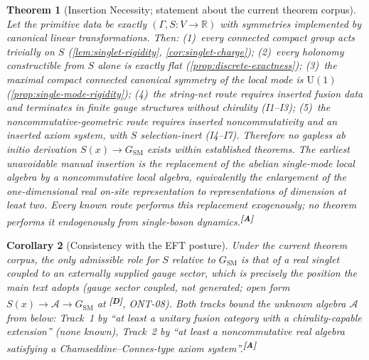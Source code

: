 \documentclass[12pt,a4paper,twoside]{article}
\theoremstyle{plain}
\newtheorem{theorem}{Theorem}[section]
\newtheorem{corollary}[theorem]{Corollary}
\theoremstyle{definition}
\theoremstyle{remark}
\newcommand{\catmark}[1]{\textsuperscript{\textsf{\textbf{[#1]}}}}
\begin{document}
\begin{theorem}[Insertion Necessity; statement about the current theorem corpus]
\label{thm:insertion-necessity}
Let the primitive data be exactly $(\Gamma,S:V\to\mathbb{R})$ with
symmetries implemented by canonical linear transformations. Then:
(1)~every connected compact group acts trivially on $S$
(\cref{lem:singlet-rigidity}, \cref{cor:singlet-charge});
(2)~every holonomy constructible from $S$ alone is exactly flat
(\cref{prop:discrete-exactness});
(3)~the maximal compact connected canonical symmetry of the local mode is
$\mathrm{U}(1)$ (\cref{prop:single-mode-rigidity});
(4)~the string-net route requires inserted fusion data and terminates in
finite gauge structures without chirality (I1--I3);
(5)~the noncommutative-geometric route requires inserted noncommutativity
and an inserted axiom system, with $S$ selection-inert (I4--I7).
Therefore no gapless ab initio derivation $S(x)\to G_{\mathrm{SM}}$ exists
within established theorems. The earliest unavoidable manual insertion is
the replacement of the abelian single-mode local algebra by a noncommutative
local algebra, equivalently the enlargement of the one-dimensional real
on-site representation to representations of dimension at least two. Every
known route performs this replacement exogenously; no theorem performs it
endogenously from single-boson dynamics.\catmark{A}
\end{theorem}

\begin{corollary}[Consistency with the EFT posture]
\label{cor:eft-posture}
Under the current theorem corpus, the only admissible role for $S$ relative
to $G_{\mathrm{SM}}$ is that of a real singlet coupled to an externally
supplied gauge sector, which is precisely the position the main text adopts
(gauge sector coupled, not generated; open form
$S(x)\to\mathcal{A}\to G_{\mathrm{SM}}$ at \catmark{D}, ONT-08). Both
tracks bound the unknown algebra $\mathcal{A}$ from below: Track~1 by ``at
least a unitary fusion category with a chirality-capable extension'' (none
known), Track~2 by ``at least a noncommutative real algebra satisfying a
Chamseddine--Connes-type axiom system''.\catmark{A}
\end{corollary}
\end{document}
